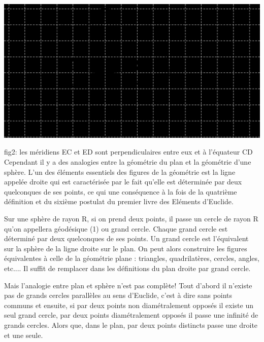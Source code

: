 \documentclass[a4paper, 12pt, twoside]{book}
\begin{document}
 \newpage
 

 
  
  
  \includegraphics[scale=0.7]{figures/neuc.eps} 
  
  fig2:
  les méridiens EC et ED sont perpendiculaires entre eux et à l'équateur CD\\
  
  
  Cependant il y a des analogies entre la géométrie du plan et la géométrie d'une sphère. L'un des éléments essentiels des figures de la géométrie est la ligne appelée droite qui est caractérisée par le fait qu'elle est déterminée par deux quelconques de ses points, ce qui une conséquence à la fois  de la quatrième définition  et du sixième postulat du premier livre des Eléments d'Euclide.\
  
   
 
 Sur une sphère de rayon R, si on prend deux points, il passe un cercle de rayon R qu'on appellera géodésique (1) ou grand cercle. Chaque grand cercle est déterminé  par deux quelconques de ses points. Un grand cercle est l'équivalent sur la sphère de la ligne droite sur le plan. On peut alors construire les figures équivalentes à celle de la géométrie plane : triangles, quadrilatères, cercles, angles, etc.... Il suffit de remplacer dans les définitions du plan droite par grand cercle. \
 
 Mais l'analogie entre plan et sphère n'est pas complète! Tout d'abord il n'existe pas de grands cercles parallèles au sens d'Euclide, c'est à dire sans points communs et ensuite, si par  deux points non diamétralement opposés il existe un seul grand cercle, par deux points  diamétralement opposés il passe une infinité  de grands cercles. Alors que, dans le plan, par deux points distincts passe une droite et une seule. \\
    
\end{document}
